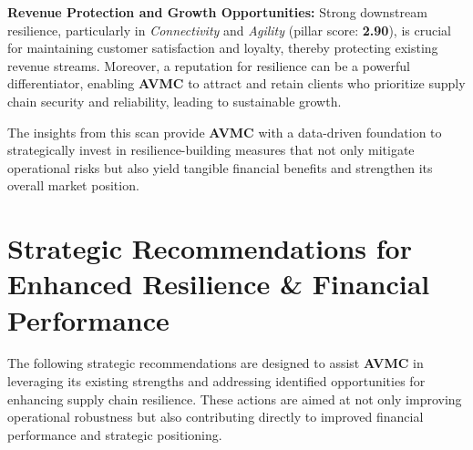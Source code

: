\documentclass[
  oneside,
  open=any,
  fontsize=11pt]{scrbook}
\begin{document}
\textbf{Revenue Protection and Growth Opportunities:} Strong downstream
resilience, particularly in \emph{Connectivity} and \emph{Agility}
(pillar score: \textbf{2.90}), is crucial for maintaining customer
satisfaction and loyalty, thereby protecting existing revenue streams.
Moreover, a reputation for resilience can be a powerful differentiator,
enabling \textbf{AVMC} to attract and retain clients who prioritize
supply chain security and reliability, leading to sustainable growth.

The insights from this scan provide \textbf{AVMC} with a data-driven
foundation to strategically invest in resilience-building measures that
not only mitigate operational risks but also yield tangible financial
benefits and strengthen its overall market position.

\chapter{Strategic Recommendations for Enhanced Resilience \& Financial
Performance}\label{strategic-recommendations-for-enhanced-resilience-financial-performance}

The following strategic recommendations are designed to assist
\textbf{AVMC} in leveraging its existing strengths and addressing
identified opportunities for enhancing supply chain resilience. These
actions are aimed at not only improving operational robustness but also
contributing directly to improved financial performance and strategic
positioning.
\end{document}
